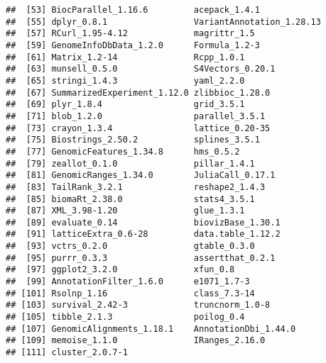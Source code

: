 \documentclass[]{article}
\begin{document}
\begin{verbatim}
##  [53] BiocParallel_1.16.6         acepack_1.4.1              
##  [55] dplyr_0.8.1                 VariantAnnotation_1.28.13  
##  [57] RCurl_1.95-4.12             magrittr_1.5               
##  [59] GenomeInfoDbData_1.2.0      Formula_1.2-3              
##  [61] Matrix_1.2-14               Rcpp_1.0.1                 
##  [63] munsell_0.5.0               S4Vectors_0.20.1           
##  [65] stringi_1.4.3               yaml_2.2.0                 
##  [67] SummarizedExperiment_1.12.0 zlibbioc_1.28.0            
##  [69] plyr_1.8.4                  grid_3.5.1                 
##  [71] blob_1.2.0                  parallel_3.5.1             
##  [73] crayon_1.3.4                lattice_0.20-35            
##  [75] Biostrings_2.50.2           splines_3.5.1              
##  [77] GenomicFeatures_1.34.8      hms_0.5.2                  
##  [79] zeallot_0.1.0               pillar_1.4.1               
##  [81] GenomicRanges_1.34.0        JuliaCall_0.17.1           
##  [83] TailRank_3.2.1              reshape2_1.4.3             
##  [85] biomaRt_2.38.0              stats4_3.5.1               
##  [87] XML_3.98-1.20               glue_1.3.1                 
##  [89] evaluate_0.14               biovizBase_1.30.1          
##  [91] latticeExtra_0.6-28         data.table_1.12.2          
##  [93] vctrs_0.2.0                 gtable_0.3.0               
##  [95] purrr_0.3.3                 assertthat_0.2.1           
##  [97] ggplot2_3.2.0               xfun_0.8                   
##  [99] AnnotationFilter_1.6.0      e1071_1.7-3                
## [101] Rsolnp_1.16                 class_7.3-14               
## [103] survival_2.42-3             truncnorm_1.0-8            
## [105] tibble_2.1.3                poilog_0.4                 
## [107] GenomicAlignments_1.18.1    AnnotationDbi_1.44.0       
## [109] memoise_1.1.0               IRanges_2.16.0             
## [111] cluster_2.0.7-1
\end{verbatim}
\end{document}
